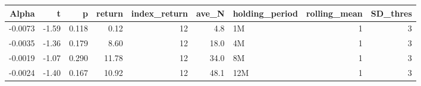 \begin{table}[ht]
\centering
\begin{tabular}{rrrrrrlrr}
  \hline
Alpha & t & p & return & index\_return & ave\_N & holding\_period & rolling\_mean & SD\_thres \\ 
  \hline
-0.0073 & -1.59 & 0.118 & 0.12 & 12 & 4.8 & 1M &  1 &  3 \\ 
  -0.0035 & -1.36 & 0.179 & 8.60 & 12 & 18.0 & 4M &  1 &  3 \\ 
  -0.0019 & -1.07 & 0.290 & 11.78 & 12 & 34.0 & 8M &  1 &  3 \\ 
  -0.0024 & -1.40 & 0.167 & 10.92 & 12 & 48.1 & 12M &  1 &  3 \\ 
   \hline
\end{tabular}
\end{table}

